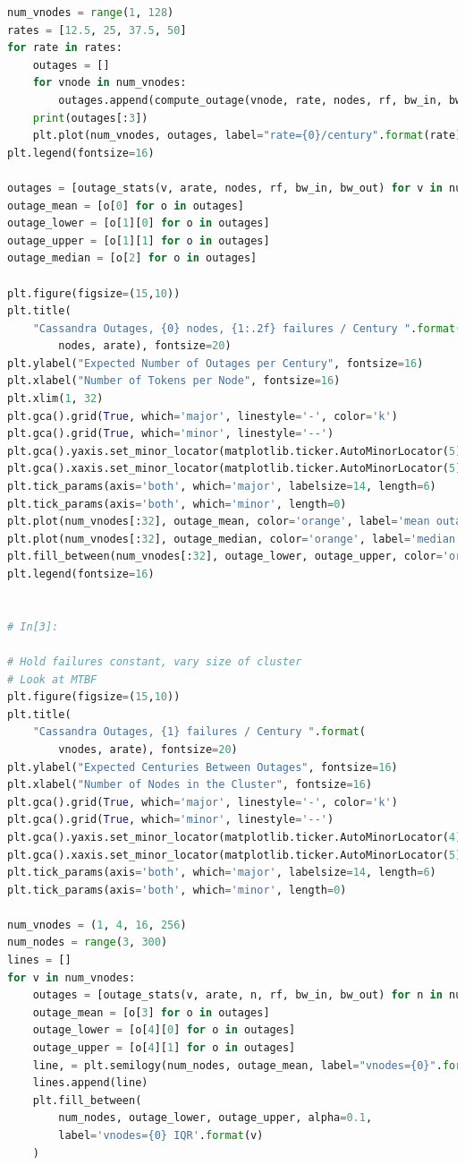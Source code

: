 \documentclass{article}
\begin{document}
\begin{lstlisting}[language=Python]
num_vnodes = range(1, 128)
rates = [12.5, 25, 37.5, 50]
for rate in rates:
    outages = []
    for vnode in num_vnodes:
        outages.append(compute_outage(vnode, rate, nodes, rf, bw_in, bw_out))
    print(outages[:3])
    plt.plot(num_vnodes, outages, label="rate={0}/century".format(rate))
plt.legend(fontsize=16)

outages = [outage_stats(v, arate, nodes, rf, bw_in, bw_out) for v in num_vnodes[:32]]
outage_mean = [o[0] for o in outages]
outage_lower = [o[1][0] for o in outages]
outage_upper = [o[1][1] for o in outages]
outage_median = [o[2] for o in outages]

plt.figure(figsize=(15,10))
plt.title(
    "Cassandra Outages, {0} nodes, {1:.2f} failures / Century ".format(
        nodes, arate), fontsize=20)
plt.ylabel("Expected Number of Outages per Century", fontsize=16)
plt.xlabel("Number of Tokens per Node", fontsize=16)
plt.xlim(1, 32)
plt.gca().grid(True, which='major', linestyle='-', color='k')
plt.gca().grid(True, which='minor', linestyle='--')
plt.gca().yaxis.set_minor_locator(matplotlib.ticker.AutoMinorLocator(5))
plt.gca().xaxis.set_minor_locator(matplotlib.ticker.AutoMinorLocator(5))
plt.tick_params(axis='both', which='major', labelsize=14, length=6)
plt.tick_params(axis='both', which='minor', length=0)
plt.plot(num_vnodes[:32], outage_mean, color='orange', label='mean outages')
plt.plot(num_vnodes[:32], outage_median, color='orange', label='median outages', linestyle='--')
plt.fill_between(num_vnodes[:32], outage_lower, outage_upper, color='orange', alpha=0.05, label='IQR')
plt.legend(fontsize=16)


# In[3]:

# Hold failures constant, vary size of cluster
# Look at MTBF
plt.figure(figsize=(15,10))
plt.title(
    "Cassandra Outages, {1} failures / Century ".format(
        vnodes, arate), fontsize=20)
plt.ylabel("Expected Centuries Between Outages", fontsize=16)
plt.xlabel("Number of Nodes in the Cluster", fontsize=16)
plt.gca().grid(True, which='major', linestyle='-', color='k')
plt.gca().grid(True, which='minor', linestyle='--')
plt.gca().yaxis.set_minor_locator(matplotlib.ticker.AutoMinorLocator(4))
plt.gca().xaxis.set_minor_locator(matplotlib.ticker.AutoMinorLocator(5))
plt.tick_params(axis='both', which='major', labelsize=14, length=6)
plt.tick_params(axis='both', which='minor', length=0)

num_vnodes = (1, 4, 16, 256)
num_nodes = range(3, 300)
lines = []
for v in num_vnodes:
    outages = [outage_stats(v, arate, n, rf, bw_in, bw_out) for n in num_nodes]
    outage_mean = [o[3] for o in outages]
    outage_lower = [o[4][0] for o in outages]
    outage_upper = [o[4][1] for o in outages]
    line, = plt.semilogy(num_nodes, outage_mean, label="vnodes={0}".format(v))
    lines.append(line)
    plt.fill_between(
        num_nodes, outage_lower, outage_upper, alpha=0.1,
        label='vnodes={0} IQR'.format(v)
    )


\end{lstlisting}
\end{document}

